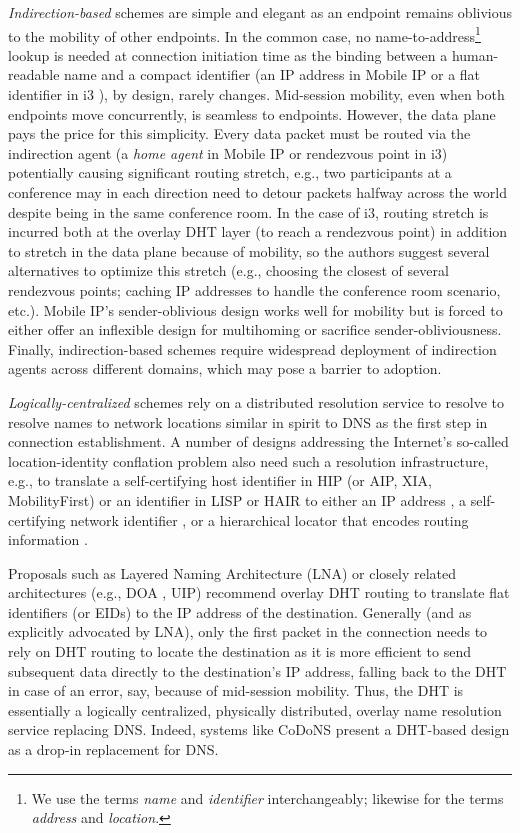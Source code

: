 {{\em Indirection-based} schemes are simple and elegant as an endpoint remains oblivious to the mobility of other endpoints. In the common case, no name-to-address\footnote{We use the terms {\em name} and {\em identifier} interchangeably; likewise for the terms {\em address} and {\em location}.} lookup is needed at connection initiation time as the binding between a human-readable name and a compact identifier (an IP address in Mobile IP \cite{MIP} or a flat identifier in i3 \cite{i3}), by design, rarely changes. Mid-session mobility, even when both endpoints move concurrently, is seamless to endpoints. However, the data plane pays the price for this simplicity. Every data packet must be routed via the indirection agent (a {\em home agent} in Mobile IP or rendezvous point in i3) potentially causing significant routing stretch, e.g., two participants at a conference may in each direction need to detour packets halfway across the world despite being in the same conference room. In the case of i3, routing stretch is incurred both at the overlay DHT layer (to reach a rendezvous point) in addition to stretch in the data plane because of mobility, so the authors suggest several alternatives to optimize this stretch  (e.g., choosing the closest of several rendezvous points;  caching IP addresses to handle the conference room scenario, etc.). Mobile IP's sender-oblivious design works well for mobility but is forced to either offer an inflexible design for multihoming or sacrifice sender-obliviousness.  Finally, indirection-based schemes require widespread deployment of indirection agents across different domains, which may pose a barrier to adoption.

{\em Logically-centralized} schemes rely on a distributed resolution service to resolve to resolve names to network locations similar in spirit to DNS as the first step in connection establishment. A number of designs addressing the Internet's so-called location-identity conflation problem also need such a resolution infrastructure, e.g., to translate a self-certifying host identifier in HIP \cite{HIP} (or AIP\cite{AIP}, XIA\cite{XIA}, MobilityFirst\cite{MobilityFirst-UMASS}) or an identifier in LISP \cite{LISP} or HAIR \cite{HAIR} to either an IP address \cite{HIP}, a self-certifying network identifier \cite{AIP,XIA,MobilityFirst-UMASS}, or a hierarchical locator that encodes routing information \cite{HAIR}. 

Proposals such as Layered Naming Architecture (LNA) \cite{LNA} or closely related architectures (e.g., DOA \cite{DOA}, UIP\cite{UIP}) recommend overlay DHT routing to translate flat identifiers (or EIDs) to the IP address of the destination. Generally (and as explicitly advocated by LNA), only the first packet in the connection needs to rely on DHT routing to locate the destination as it is more efficient to send subsequent data directly to the destination's IP address, falling back to the DHT in case of an error, say, because of mid-session mobility. Thus, the DHT is essentially a logically centralized, physically distributed, overlay name resolution service replacing DNS. Indeed, systems like CoDoNS \cite{codons-paper} present a DHT-based design as a drop-in replacement for DNS. 

}
